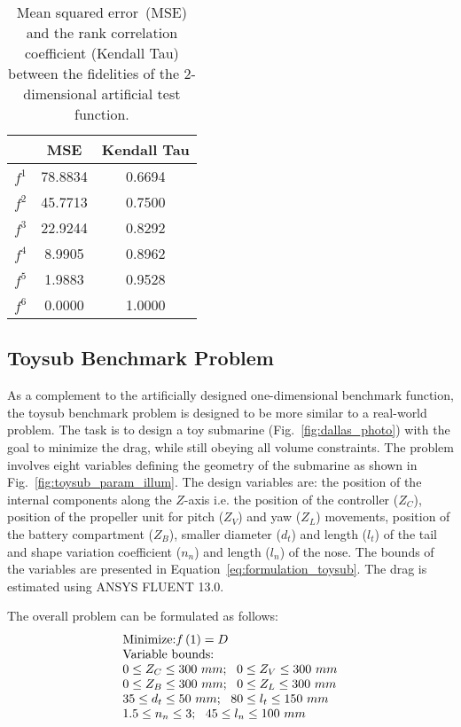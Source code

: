 \begin{table}[!htb]
	\caption{Mean squared error~(MSE) and the rank correlation coefficient (Kendall Tau) between the fidelities of the 2-dimensional artificial test function.}
	\label{table:mse_tau_2d}
	\begin{center}
		\begin{tabular}{c|c|c}
			\hline
			&MSE&Kendall Tau\\
			\hline
			$f^1$ &78.8834 & 0.6694 \\
			$f^2$ &45.7713 & 0.7500\\
			$f^3$ &22.9244 & 0.8292\\
			$f^4$ &8.9905 & 0.8962\\
			$f^5$ &1.9883 & 0.9528\\
			$f^6$ &0.0000 & 1.0000\\
			\hline
		\end{tabular}
	\end{center}
\end{table}


\subsection{Toysub Benchmark Problem}
As a complement to the artificially designed one-dimensional benchmark function, the toysub benchmark problem is designed to be more similar to a real-world problem.
The task is to design a toy submarine (Fig.~\ref{fig:dallas_photo}) with the goal to minimize the drag, while still obeying all volume constraints. The problem involves eight variables defining the geometry of the submarine as shown in Fig.~\ref{fig:toysub_param_illum}. The design variables are: the position of the internal components along the $Z$-axis i.e. the position of the controller ($Z_C$), position of the propeller unit for pitch ($Z_V$) and yaw ($Z_L$) movements, position of the battery compartment ($Z_B$), smaller diameter ($d_t$) and length ($l_t$) of the tail and shape variation coefficient ($n_n$) and length ($l_n$) of the nose. The bounds of the variables are presented in Equation~\ref{eq:formulation_toysub}. The drag is estimated using ANSYS FLUENT 13.0.

The overall problem can be formulated as follows:
\begin{equation}
\begin{array}[p]{l}
\text{Minimize:}f\left(1\right) = D \\
\text{Variable bounds:}
\\
0 \le Z_C \le 300~mm;~~0 \le Z_V \le 300~mm
\\
0 \le Z_B \le 300~mm;~~0 \le Z_L \le 300~mm
\\
35 \le d_t \le 50~mm;~~80 \le l_t \le 150~mm
\\
1.5 \le n_n \le 3;~~45 \le l_n \le 100~mm
\label{eq:formulation_toysub}
\end{array}
\end{equation}

